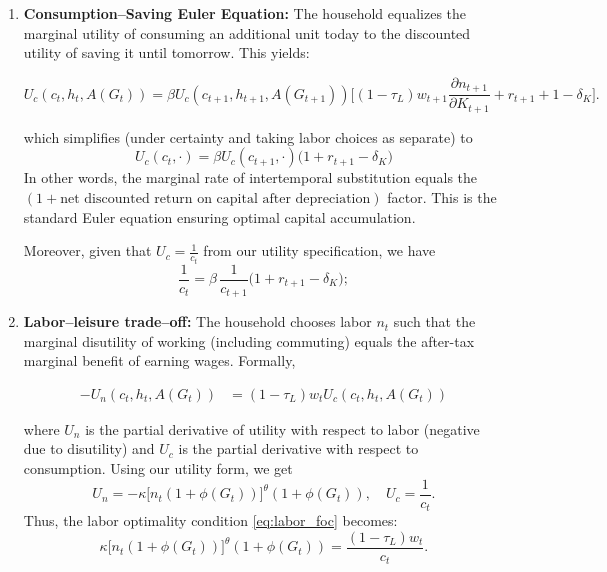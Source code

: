 \begin{enumerate}
  \item \textbf{Consumption–Saving Euler Equation:} The household equalizes the marginal utility of consuming an additional unit today to the discounted utility of saving it until tomorrow. This yields:

    \begin{equation}
    U_c(c_t, h_t, A(G_t)) = \beta U_c(c_{t+1}, h_{t+1}, A(G_{t+1})) \bigl[(1-\tau_L)w_{t+1} \frac{\partial n_{t+1}}{\partial K_{t+1}} + r_{t+1} + 1 - \delta_K\bigr].
    \end{equation}

    which simplifies (under certainty and taking labor choices as separate) to
    \begin{equation}
    U_c(c_t,\cdot) = \beta U_c(c_{t+1},\cdot)\bigl(1 + r_{t+1} - \delta_K\bigr)
    \end{equation}
    In other words, the marginal rate of intertemporal substitution equals the \((1 + \text{net discounted return on capital after depreciation})\) factor. This is the standard Euler equation ensuring optimal capital accumulation.

    Moreover, given that $U_c = \frac{1}{c_t}$ from our utility specification, we have
    \begin{equation}
        \frac{1}{c_t} = \beta\,\frac{1}{c_{t+1}}\bigl(1+r_{t+1}-\delta_K\bigr);\label{eq:euler}
    \end{equation}


  \item \textbf{Labor--leisure trade–off:} The household chooses labor $n_t$ such that the marginal disutility of working (including commuting) equals the after-tax marginal benefit of earning wages. Formally,

    \begin{align}
    -U_n(c_t, h_t, A(G_t)) &= (1-\tau_L)w_t U_c(c_t, h_t, A(G_t))
    \label{eq:labor_foc}
    \end{align}

    where $U_n$ is the partial derivative of utility with respect to labor (negative due to disutility) and $U_c$ is the partial derivative with respect to consumption. Using our utility form, we get
    \begin{equation}
    U_n = -\kappa \bigl[n_t(1+\phi(G_t))\bigr]^{\theta}(1+\phi(G_t)), \quad U_c = \frac{1}{c_t}.
    \end{equation}
    Thus, the labor optimality condition \ref{eq:labor_foc} becomes:
    \begin{equation}
    \kappa \bigl[n_t(1+\phi(G_t))\bigr]^{\theta}(1+\phi(G_t)) = \frac{(1-\tau_L)w_t}{c_t}.
    \end{equation}


\end{enumerate}
